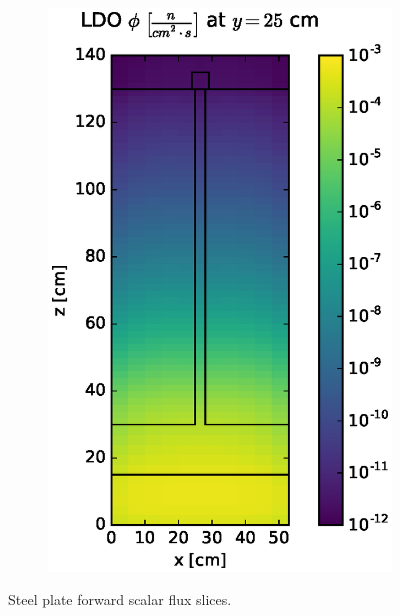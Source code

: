 \documentclass{article} %
\begin{document}
\begin{figure}[!htb]
\begin{subfigure}{0.4\textwidth}
\includegraphics[max height=0.445\textheight]
{img/steel-fwd-flux-ldo11.eps}
\end{subfigure}
\caption{Steel plate forward scalar flux slices.}
\label{steel-fwd-slices}
\end{figure}
\end{document}
